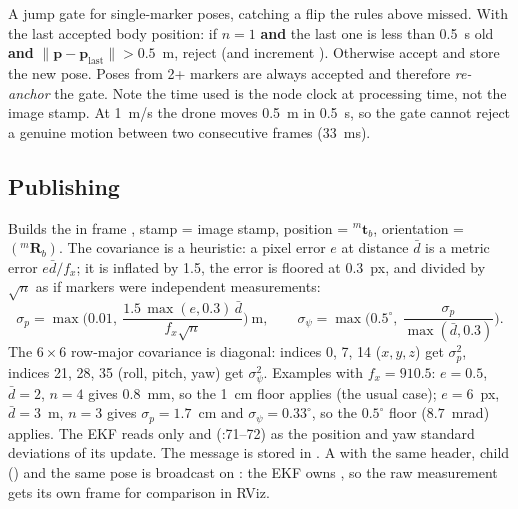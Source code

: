 \label{sec:plausible}
A jump gate for single-marker poses, catching a flip the rules above missed. With 
the last accepted body position: if $n=1$ \textbf{and} the last one is less than 0.5~s old \textbf{and}
$\lVert \mathbf p - \mathbf p_{\text{last}}\rVert > 0.5$~m, reject (and increment ). Otherwise accept and
store the new pose. Poses from 2+ markers are always accepted and therefore \emph{re-anchor} the gate. Note the time
used is the node clock at processing time, not the image stamp. At 1~m/s the drone moves 0.5~m in 0.5~s, so the gate
cannot reject a genuine motion between two consecutive frames (33~ms).

\subsection{Publishing}

Builds the  in frame , stamp = image stamp, position = ${}^m\mathbf t_b$,
orientation = $({}^m\mathbf R_b)$. The covariance is a heuristic: a pixel error $e$ at
distance $\bar d$ is a metric error $e\bar d/f_x$; it is inflated by 1.5, the error is floored at 0.3~px, and divided by
$\sqrt n$ as if markers were independent measurements:
\begin{equation}
\sigma_p = \max\!\Big(0.01,\ \frac{1.5\,\max(e,0.3)\,\bar d}{f_x\sqrt n}\Big)\ \text{m},\qquad
\sigma_\psi = \max\!\Big(0.5^\circ,\ \frac{\sigma_p}{\max(\bar d,0.3)}\Big).
\end{equation}
The $6\times6$ row-major covariance is diagonal: indices 0, 7, 14 ($x,y,z$) get $\sigma_p^2$, indices 21, 28, 35
(roll, pitch, yaw) get $\sigma_\psi^2$. Examples with $f_x=910.5$: $e=0.5$, $\bar d=2$, $n=4$ gives 0.8~mm, so the 1~cm
floor applies (the usual case); $e=6$~px, $\bar d=3$~m, $n=3$ gives $\sigma_p=1.7$~cm and $\sigma_\psi=0.33^\circ$, so
the $0.5^\circ$ floor ($8.7$~mrad) applies. The EKF reads only  and 
(:71--72) as the position and yaw standard deviations of its update. The message is stored in
. A  with the same header, child 
() and the same pose is broadcast on : the EKF owns , so the raw
measurement gets its own frame for comparison in RViz.

